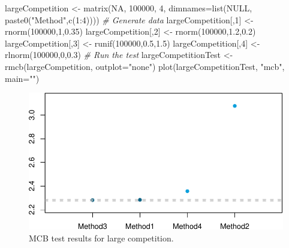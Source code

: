 \documentclass[
]{book}
\newenvironment{Shaded}{\begin{snugshade}}{\end{snugshade}}
\newcommand{\AttributeTok}[1]{\textcolor[rgb]{0.77,0.63,0.00}{#1}}
\newcommand{\CommentTok}[1]{\textcolor[rgb]{0.56,0.35,0.01}{\textit{#1}}}
\newcommand{\ConstantTok}[1]{\textcolor[rgb]{0.00,0.00,0.00}{#1}}
\newcommand{\DecValTok}[1]{\textcolor[rgb]{0.00,0.00,0.81}{#1}}
\newcommand{\FloatTok}[1]{\textcolor[rgb]{0.00,0.00,0.81}{#1}}
\newcommand{\FunctionTok}[1]{\textcolor[rgb]{0.00,0.00,0.00}{#1}}
\newcommand{\NormalTok}[1]{#1}
\newcommand{\OtherTok}[1]{\textcolor[rgb]{0.56,0.35,0.01}{#1}}
\newcommand{\SpecialCharTok}[1]{\textcolor[rgb]{0.00,0.00,0.00}{#1}}
\newcommand{\StringTok}[1]{\textcolor[rgb]{0.31,0.60,0.02}{#1}}
\theoremstyle{definition}
\theoremstyle{definition}
\theoremstyle{definition}
\theoremstyle{definition}
\theoremstyle{remark}
\begin{document}
\begin{Shaded}
\begin{Highlighting}[]
\NormalTok{largeCompetition }\OtherTok{\textless{}{-}} 
  \FunctionTok{matrix}\NormalTok{(}\ConstantTok{NA}\NormalTok{, }\DecValTok{100000}\NormalTok{, }\DecValTok{4}\NormalTok{,}
         \AttributeTok{dimnames=}\FunctionTok{list}\NormalTok{(}\ConstantTok{NULL}\NormalTok{, }\FunctionTok{paste0}\NormalTok{(}\StringTok{"Method"}\NormalTok{,}\FunctionTok{c}\NormalTok{(}\DecValTok{1}\SpecialCharTok{:}\DecValTok{4}\NormalTok{))))}
\CommentTok{\# Generate data}
\NormalTok{largeCompetition[,}\DecValTok{1}\NormalTok{] }\OtherTok{\textless{}{-}} \FunctionTok{rnorm}\NormalTok{(}\DecValTok{100000}\NormalTok{,}\DecValTok{1}\NormalTok{,}\FloatTok{0.35}\NormalTok{)}
\NormalTok{largeCompetition[,}\DecValTok{2}\NormalTok{] }\OtherTok{\textless{}{-}} \FunctionTok{rnorm}\NormalTok{(}\DecValTok{100000}\NormalTok{,}\FloatTok{1.2}\NormalTok{,}\FloatTok{0.2}\NormalTok{)}
\NormalTok{largeCompetition[,}\DecValTok{3}\NormalTok{] }\OtherTok{\textless{}{-}} \FunctionTok{runif}\NormalTok{(}\DecValTok{100000}\NormalTok{,}\FloatTok{0.5}\NormalTok{,}\FloatTok{1.5}\NormalTok{)}
\NormalTok{largeCompetition[,}\DecValTok{4}\NormalTok{] }\OtherTok{\textless{}{-}} \FunctionTok{rlnorm}\NormalTok{(}\DecValTok{100000}\NormalTok{,}\DecValTok{0}\NormalTok{,}\FloatTok{0.3}\NormalTok{)}
\CommentTok{\# Run the test}
\NormalTok{largeCompetitionTest }\OtherTok{\textless{}{-}} \FunctionTok{rmcb}\NormalTok{(largeCompetition, }\AttributeTok{outplot=}\StringTok{"none"}\NormalTok{)}
\FunctionTok{plot}\NormalTok{(largeCompetitionTest, }\StringTok{"mcb"}\NormalTok{, }\AttributeTok{main=}\StringTok{""}\NormalTok{)}
\end{Highlighting}
\end{Shaded}

\begin{figure}
\centering
\includegraphics{Svetunkov--2022----ADAM_files/figure-latex/mcbForCompetitionLarge-1.pdf}
\caption{\label{fig:mcbForCompetitionLarge}MCB test results for large competition.}
\end{figure}
\end{document}
